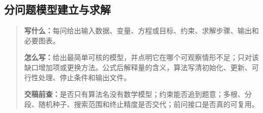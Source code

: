 \subsection{分问题模型建立与求解}
\begin{quote}\small
\noindent\textbf{\color{inkblue}写什么：}每问给出输入数据、变量、方程或目标、约束、求解步骤、输出和必要图表。\par
\noindent\textbf{\color{inkblue}怎么写：}给出最简单可核的模型，并点明它在哪个可观察情形不足；只对该缺口增加项或更换方法。公式后解释量的含义，算法写清初始化、更新、可行性处理、停止条件和输出文件。\par
\noindent\textbf{\color{inkblue}交稿前查：}是否只有算法名没有数学模型；约束能否追到题意；多根、分段、随机种子、搜索范围和终止精度是否交代；前问接口是否真的可复用。
\end{quote}

